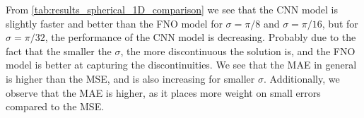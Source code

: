 From \autoref{tab:results_spherical_1D_comparison} we see that the CNN model is slightly faster and better than the FNO model for $\sigma = \pi/8$ and $\sigma = \pi/16$, but for $\sigma = \pi/32$, the performance of the CNN model is decreasing.
Probably due to the fact that the smaller the $\sigma$, the more discontinuous the solution is, and the FNO model is better at capturing the discontinuities.
We see that the MAE in general is higher than the MSE, and is also increasing for smaller $\sigma$.
Additionally, we observe that the MAE is higher, as it places more weight on small errors compared to the MSE.


